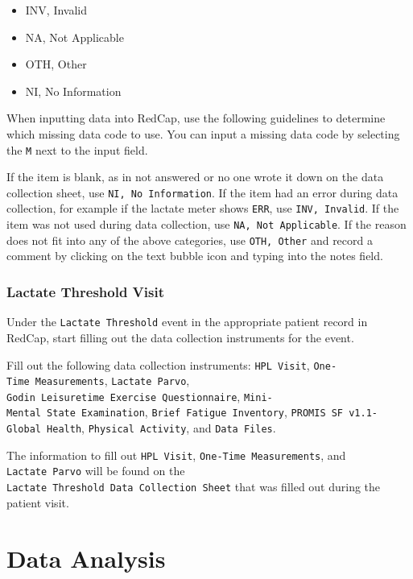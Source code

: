 \documentclass[
]{book}
\providecommand{\tightlist}{%
  \setlength{\itemsep}{0pt}\setlength{\parskip}{0pt}}
\begin{document}
\begin{itemize}
\tightlist
\item
  INV, Invalid
\item
  NA, Not Applicable
\item
  OTH, Other
\item
  NI, No Information
\end{itemize}

When inputting data into RedCap, use the following guidelines to determine which missing data code to use. You can input a missing data code by selecting the \texttt{M} next to the input field.

If the item is blank, as in not answered or no one wrote it down on the data collection sheet, use \texttt{NI,\ No\ Information}. If the item had an error during data collection, for example if the lactate meter shows \texttt{ERR}, use \texttt{INV,\ Invalid}. If the item was not used during data collection, use \texttt{NA,\ Not\ Applicable}. If the reason does not fit into any of the above categories, use \texttt{OTH,\ Other} and record a comment by clicking on the text bubble icon and typing into the notes field.

\hypertarget{lactate-threshold-visit}{%
\subsection{Lactate Threshold Visit}\label{lactate-threshold-visit}}

Under the \texttt{Lactate\ Threshold} event in the appropriate patient record in RedCap, start filling out the data collection instruments for the event.

Fill out the following data collection instruments: \texttt{HPL\ Visit}, \texttt{One-Time\ Measurements}, \texttt{Lactate\ Parvo}, \texttt{Godin\ Leisuretime\ Exercise\ Questionnaire}, \texttt{Mini-Mental\ State\ Examination}, \texttt{Brief\ Fatigue\ Inventory}, \texttt{PROMIS\ SF\ v1.1-Global\ Health}, \texttt{Physical\ Activity}, and \texttt{Data\ Files}.

The information to fill out \texttt{HPL\ Visit}, \texttt{One-Time\ Measurements}, and \texttt{Lactate\ Parvo} will be found on the \texttt{Lactate\ Threshold\ Data\ Collection\ Sheet} that was filled out during the patient visit.

\hypertarget{DataAnalysis}{%
\chapter{Data Analysis}\label{DataAnalysis}}
\end{document}
